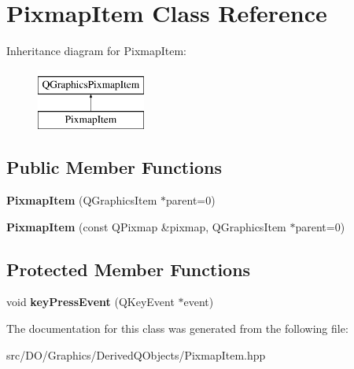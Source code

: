 \hypertarget{class_d_o_1_1_pixmap_item}{\section{Pixmap\-Item Class Reference}
\label{class_d_o_1_1_pixmap_item}
}
Inheritance diagram for Pixmap\-Item\-:\begin{figure}[H]
\begin{center}
\leavevmode
\includegraphics[height=2.000000cm]{class_d_o_1_1_pixmap_item}
\end{center}
\end{figure}
\subsection*{Public Member Functions}
\begin{DoxyCompactItemize}
\item 
\hypertarget{class_d_o_1_1_pixmap_item_a998f8cd639af4f18afab0219a0bfb0ec}{{\bfseries Pixmap\-Item} (Q\-Graphics\-Item $\ast$parent=0)}\label{class_d_o_1_1_pixmap_item_a998f8cd639af4f18afab0219a0bfb0ec}

\item 
\hypertarget{class_d_o_1_1_pixmap_item_a7dbbbb0c63ba52709ff0b73410093f8f}{{\bfseries Pixmap\-Item} (const Q\-Pixmap \&pixmap, Q\-Graphics\-Item $\ast$parent=0)}\label{class_d_o_1_1_pixmap_item_a7dbbbb0c63ba52709ff0b73410093f8f}

\end{DoxyCompactItemize}
\subsection*{Protected Member Functions}
\begin{DoxyCompactItemize}
\item 
\hypertarget{class_d_o_1_1_pixmap_item_adf2e9d5e456a754a5459e8435b0b094b}{void {\bfseries key\-Press\-Event} (Q\-Key\-Event $\ast$event)}\label{class_d_o_1_1_pixmap_item_adf2e9d5e456a754a5459e8435b0b094b}

\end{DoxyCompactItemize}


The documentation for this class was generated from the following file\-:\begin{DoxyCompactItemize}
\item 
src/\-D\-O/\-Graphics/\-Derived\-Q\-Objects/Pixmap\-Item.\-hpp\end{DoxyCompactItemize}
